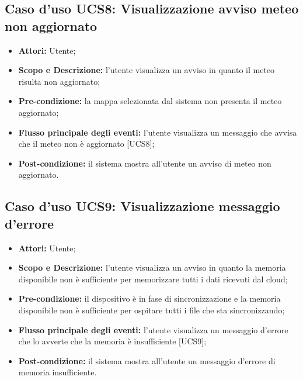 \subsection{Caso d'uso UCS8: Visualizzazione avviso meteo non aggiornato}
\begin{itemize}
\item \textbf{Attori:} Utente;
\item \textbf{Scopo e Descrizione:} l'utente visualizza un avviso in quanto il meteo risulta non aggiornato;
\item \textbf{Pre-condizione:} la mappa selezionata dal sistema non presenta il meteo aggiornato; 
\item \textbf{Flusso principale degli eventi:} l'utente visualizza un messaggio che avvisa che il meteo non è aggiornato [UCS8];
\item \textbf{Post-condizione:} il sistema mostra all'utente un avviso di meteo non aggiornato.
\end{itemize}

\subsection{Caso d'uso UCS9: Visualizzazione messaggio d'errore}
\begin{itemize}
\item \textbf{Attori:} Utente;
\item \textbf{Scopo e Descrizione:} l'utente visualizza un avviso in quanto la memoria disponibile non è sufficiente per memorizzare tutti i dati ricevuti dal cloud;
\item \textbf{Pre-condizione:} il dispositivo è in fase di sincronizzazione e la memoria disponibile non è sufficiente per ospitare tutti i file che sta sincronizzando; 
\item \textbf{Flusso principale degli eventi:} l'utente visualizza un messaggio d'errore che lo avverte che la memoria è insufficiente [UCS9];
\item \textbf{Post-condizione:} il sistema mostra all'utente un messaggio d'errore di memoria insufficiente.
\end{itemize}

